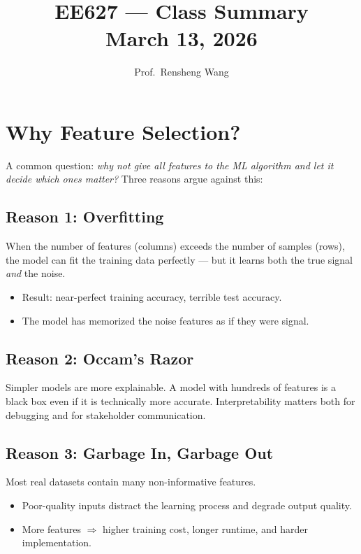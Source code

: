 \documentclass[11pt]{article}
\title{\textbf{EE627 --- Class Summary}\\[0.4em]
       \large March 13, 2026}
\author{Prof.\ Rensheng Wang}
\date{}
\begin{document}
\maketitle
\tableofcontents
\newpage

\section{Why Feature Selection?}

A common question: \textit{why not give all features to the ML algorithm
and let it decide which ones matter?} Three reasons argue against this:

\subsection{Reason 1: Overfitting}
When the number of features (columns) exceeds the number of samples
(rows), the model can fit the training data perfectly --- but it learns
both the true signal \emph{and} the noise.
\begin{itemize}
    \item Result: near-perfect training accuracy, terrible test accuracy.
    \item The model has memorized the noise features as if they were signal.
\end{itemize}

\subsection{Reason 2: Occam's Razor}
Simpler models are more explainable. A model with hundreds of features
is a black box even if it is technically more accurate. Interpretability
matters both for debugging and for stakeholder communication.

\subsection{Reason 3: Garbage In, Garbage Out}
Most real datasets contain many non-informative features.
\begin{itemize}
    \item Poor-quality inputs distract the learning process and degrade
      output quality.
    \item More features $\Rightarrow$ higher training cost, longer runtime,
      and harder implementation.
\end{itemize}
\end{document}
